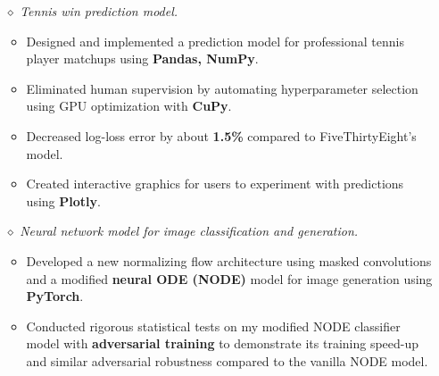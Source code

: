 \documentclass{simplecv}
\begin{document}
\begin{itemize}
  \item[$\diamond$] {\it Tennis win prediction model.} %
  \begin{itemize}
    \item Designed and implemented a prediction model for professional tennis player matchups using {\bf Pandas, NumPy}.
    \item Eliminated human supervision by automating hyperparameter selection using GPU optimization with {\bf CuPy}.
    \item Decreased log-loss error by about {\bf 1.5\%} compared to FiveThirtyEight's model.
    \item Created interactive graphics for users to experiment with predictions using {\bf Plotly}.
  \end{itemize}

  \item[$\diamond$] {\it Neural network model for image classification and generation.} %
  \begin{itemize}
    \item Developed a new normalizing flow architecture using masked convolutions and a modified {\bf neural ODE (NODE)} model for image generation using {\bf PyTorch}.%
    \vspace{0.1em}
    \item Conducted rigorous statistical tests on my modified NODE classifier model with {\bf adversarial training} to demonstrate its training speed-up and similar adversarial robustness compared to the vanilla NODE model.
  \end{itemize}
\end{itemize}
\end{document}
